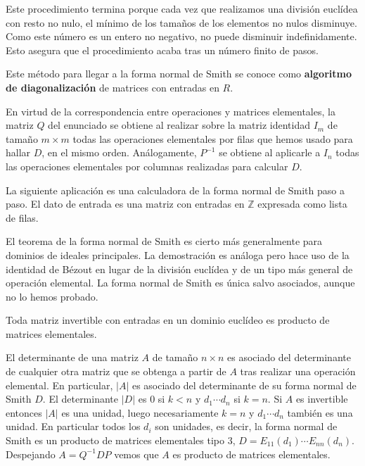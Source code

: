 Este procedimiento termina porque cada vez que realizamos una división
euclídea con resto no nulo, el mínimo de los tamaños de los elementos no
nulos disminuye. Como este número es un entero no negativo, no puede
disminuir indefinidamente. Esto asegura que el procedimiento acaba tras
un número finito de pasos.

Este método para llegar a la forma normal de Smith se conoce como
\textbf{algoritmo de diagonalización} de matrices con entradas en \(R\).

En virtud de la correspondencia entre operaciones y matrices
elementales, la matriz \(Q\) del enunciado se obtiene al realizar sobre
la matriz identidad \(I_m\) de tamaño \(m\times m\) todas las
operaciones elementales por filas que hemos usado para hallar \(D\), en
el mismo orden. Análogamente, \(P^{-1}\) se obtiene al aplicarle a
\(I_n\) todas las operaciones elementales por columnas realizadas para
calcular \(D\).


La siguiente aplicación es una calculadora de la forma normal de Smith
paso a paso. El dato de entrada es una matriz con entradas en
\(\mathbb{Z}\) expresada como lista de filas.

El teorema de la forma normal de Smith es cierto más generalmente para
dominios de ideales principales. La demostración es análoga pero hace
uso de la identidad de Bézout en lugar de la división euclídea y de un
tipo más general de operación elemental. La forma normal de Smith es
única salvo asociados, aunque no lo hemos probado.


Toda matriz invertible con entradas en un dominio euclídeo es producto
de matrices elementales. 


El determinante de una matriz \(A\) de tamaño \(n\times n\) es asociado
del determinante de cualquier otra matriz que se obtenga a partir de
\(A\) tras realizar una operación elemental. En particular, \(|A|\) es
asociado del determinante de su forma normal de Smith \(D\). El
determinante \(|D|\) es \(0\) si \(k{<}n\) y \(d_1\cdots d_n\) si
\(k=n\). Si \(A\) es invertible entonces \(|A|\) es una unidad, luego
necesariamente \(k=n\) y \(d_1\cdots d_n\) también es una unidad. En
particular todos los \(d_i\) son unidades, es decir, la forma normal de
Smith es un producto de matrices elementales tipo 3,
\(D=E_{11}(d_1)\cdots E_{nn}(d_n)\). Despejando \(A=Q^{-1}DP\) vemos
que \(A\) es producto de matrices elementales. 

